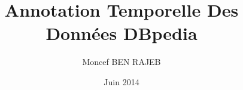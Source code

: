 \documentclass[12pt,a4paper,oneside]{book}
\begin{document}
 
\author{Moncef BEN RAJEB} 
\title{Annotation Temporelle Des Données DBpedia} 
\date{Juin 2014} 
\maketitle 
\tableofcontents 



\mainmatter 




 

\printglossary[title=Glossaire]
\makeglossaries
\end{document}
